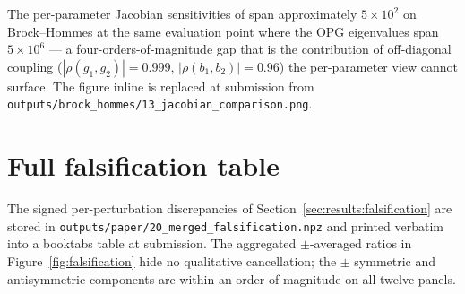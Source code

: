 The per-parameter Jacobian sensitivities of \citet{querabofarull_diffabm_2025} span approximately $5 \times 10^2$ on Brock--Hommes at the same evaluation point where the OPG eigenvalues span $5 \times 10^6$ --- a four-orders-of-magnitude gap that is the contribution of off-diagonal coupling ($|\rho(g_1, g_2)| = 0.999$, $|\rho(b_1, b_2)| = 0.96$) the per-parameter view cannot surface. The figure inline is replaced at submission from \texttt{outputs/brock\_hommes/13\_jacobian\_comparison.png}.

\section{Full falsification table}
\label{supp:falsification-table}

The signed per-perturbation discrepancies of Section~\ref{sec:results:falsification} are stored in \texttt{outputs/paper/20\_merged\_falsification.npz} and printed verbatim into a booktabs table at submission. The aggregated $\pm$-averaged ratios in Figure~\ref{fig:falsification} hide no qualitative cancellation; the $\pm$ symmetric and antisymmetric components are within an order of magnitude on all twelve panels.
